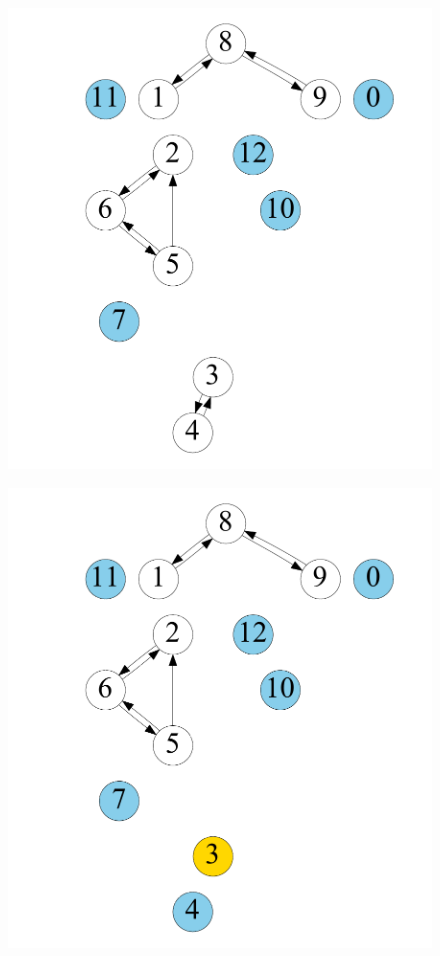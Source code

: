 \begin{figure}[t]
\begin{minipage}[b]{0.19\linewidth}
                    {\includegraphics[width=\textwidth]{./alg_fig/scc-g1}}
    \end{minipage}
    \begin{minipage}[b]{0.19\linewidth}
            \centering
                        {\includegraphics[width=\textwidth]{./alg_fig/scc-g3}}

\end{minipage}
\end{figure}
